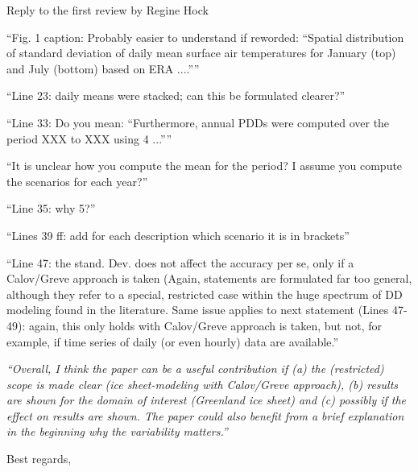 \documentclass{letter}
\newcommand{\rev}[0]{\color{blue!50!black}\it}
\newcommand{\textrev}[1]{{\rev``#1''}}
\newcommand{\revpoint}[1]{{\rev\item``#1''}}
\begin{document}
\begin{letter}{Reply to the first review by Regine Hock}
\begin{enumerate}[resume]
    \revpoint{Fig. 1 caption: Probably easier to understand if reworded: “Spatial distribution of standard deviation of daily mean surface air temperatures for January (top) and July (bottom) based on ERA ....”}

    \revpoint{Line 23: daily means were stacked; can this be formulated clearer?}

    \revpoint{Line 33: Do you mean: “Furthermore, annual PDDs were computed over the period XXX to XXX using 4 ...”}

    \revpoint{It is unclear how you compute the mean for the period? I assume you compute the scenarios for each year?}

    \revpoint{Line 35: why 5?}

    \revpoint{Lines 39 ff: add for each description which scenario it is in brackets}

    \revpoint{Line 47: the stand. Dev. does not affect the accuracy per se, only if a Calov/Greve approach is taken (Again, statements are formulated far too general, although they refer to a special, restricted case within the huge spectrum of DD modeling found in the literature. Same issue applies to next statement (Lines 47- 49): again, this only holds with Calov/Greve approach is taken, but not, for example, if time series of daily (or even hourly) data are available.}

\end{enumerate}


\textrev{Overall, I think the paper can be a useful contribution if (a) the (restricted) scope is made clear (ice sheet-modeling with Calov/Greve approach), (b) results are shown for the domain of interest (Greenland ice sheet) and (c) possibly if the effect on results are shown. The paper could also benefit from a brief explanation in the beginning why the variability matters.}

\closing{Best regards,}

\end{letter}
\end{document}
